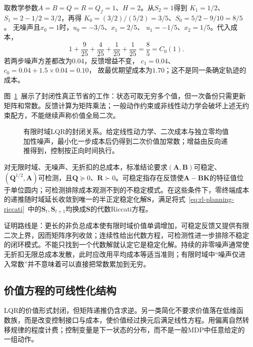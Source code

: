 \begin{example}[标量Riccati递推]
 \label{ex:rl-planning-lqr}
 取教学参数$A=B=Q=R=Q_f=1$、$H=2$。从$S_2=1$得到
 $K_1=1/2$、$S_1=2-1/2=3/2$，再得
 $K_0=(3/2)/(5/2)=3/5$、$S_0=5/2-9/10=8/5$。
 无噪声且$x_0=1$时，$u_0=-3/5$、$x_1=2/5$、
 $u_1=-1/5$、$x_2=1/5$。代入成本，
 \[
 1+\frac{9}{25}+\frac{4}{25}+\frac{1}{25}+\frac{1}{25}
 =\frac85=C_0(1).
 \]
 若两步噪声方差都改为$0.04$，反馈增益不变，
 $c_1=0.04$、$c_0=0.04+1.5\times0.04=0.10$，
 故最优期望成本为$1.70$；这不是同一条确定轨迹的成本。
\end{example}

图~\ref{fig:rl-planning-lqr-closure}~展示了封闭性真正节省的工作：状态可取无穷多个值，但一次备份只需更新矩阵和常数。反馈计算为矩阵乘法；一般动作约束或非线性动力学会破坏上述无约束配方，不能继续声称价值全局二次。

\begin{figure}[htbp]
 \centering
 
 \caption{有限时域LQR的封闭关系。给定线性动力学、二次成本与独立零均值加性噪声，最小化一步成本后仍得到二次价值加常数；增益由反向递推得到，控制按正向时间执行。}
 \label{fig:rl-planning-lqr-closure}
\end{figure}

对无限时域、无噪声、无折扣的总成本，标准结论要求$(\bm A,\bm B)$可稳定、$(\bm Q^{1/2},\bm A)$可检测，且$\bm Q\succeq0$、$\bm R\succ0$。可稳定指存在反馈使$\bm A-\bm B\bm K$的特征值位于单位圆内；可检测排除成本观测不到的不稳定模式。在这些条件下，零终端成本的递推随时域延长收敛到唯一的半正定稳定化解$\bm S$，满足将式~\eqref{eq:rl-planning-riccati}~中的$\bm S_t,\bm S_{t+1}$均换成$\bm S$的代数Riccati方程。

证明路线是：更长的非负总成本使有限时域价值单调增加，可稳定反馈又提供有限二次上界，因而矩阵序列收敛；连续性给出代数方程，可检测性进一步排除不稳定的闭环模式。不能只找到一个代数解就认定它是稳定化解。持续的非零噪声通常使无折扣无限总成本发散，此时应改用平均成本等适当准则；有限时域中“噪声仅进入常数”并不意味着可以直接把常数累加到无穷。

\subsection{价值方程的可线性化结构}
\label{sec:rl-planning-kl-control}

LQR的价值形式封闭，但矩阵递推仍含求逆。另一类简化不要求价值落在低维函数族，而是改变控制接口与成本，使价值经过换元后满足线性方程。用偏离自然转移规律的程度计费；控制变量是下一状态的分布，而不是一般MDP中任意给定的一组动作。

